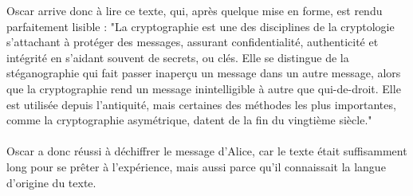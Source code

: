 		Oscar arrive donc à lire ce texte, qui, après quelque mise en forme, est rendu parfaitement lisible :
		"La cryptographie est une des disciplines de la cryptologie s’attachant à protéger des messages, assurant confidentialité, authenticité et intégrité en s’aidant souvent de secrets, ou clés.
		Elle se distingue de la stéganographie qui fait passer inaperçu un message dans un autre message, alors que la cryptographie rend un message inintelligible à autre que qui-de-droit.
		Elle est utilisée depuis l’antiquité, mais certaines des méthodes les plus importantes, comme la cryptographie asymétrique, datent de la fin du vingtième siècle."\\
		\\
		Oscar a donc réussi à déchiffrer le message d'Alice, car le texte était suffisamment long pour se prêter à l'expérience, mais aussi parce qu'il connaissait la langue d'origine du texte.
